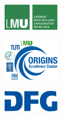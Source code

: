 \begin{frame}{}
\begin{center}
		\insertdate
	\end{center}
	\vspace{6ex}
	\centering
	\newcommand\tmp{2.6cm}
	\newcommand\tmpp{2.4cm}
	\begin{changemargin}{-1cm}{-1cm}
	\centering
	{
		\begin{minipage}{\tmp}
		\includegraphics[width=\tmpp]{figures/logos/lmu_logo.pdf}
		\end{minipage}
	}
	{
		\begin{minipage}{\tmp}
			\includegraphics[width=\tmpp]{figures/logos/cluster.pdf}
		\end{minipage}
	}%
	{
		\begin{minipage}{\tmp}
			\includegraphics[width=\tmpp]{figures/logos/dfg.pdf}

\end{minipage}}
\end{changemargin}
\end{frame}
